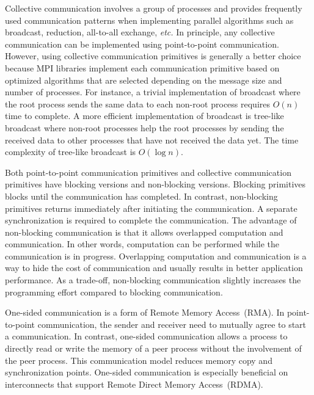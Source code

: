 Collective communication involves a group of processes and provides frequently
used communication patterns when implementing parallel algorithms such as
broadcast, reduction, all-to-all exchange, \emph{etc.} In principle, any
collective communication can be implemented using point-to-point
communication. However, using collective communication primitives is generally
a better choice because MPI libraries implement each communication primitive
based on optimized algorithms that are selected depending on the message size
and number of processes. For instance, a trivial implementation of broadcast
where the root process sends the same data to each non-root process requires
$O(n)$ time to complete. A more efficient implementation of broadcast is
tree-like broadcast where non-root processes help the root processes by
sending the received data to other processes that have not received the data
yet. The time complexity of tree-like broadcast is $O(\log n)$.

Both point-to-point communication primitives and collective communication
primitives have blocking versions and non-blocking versions. Blocking
primitives blocks until the communication has completed. In contrast,
non-blocking primitives returns immediately after initiating the
communication. A separate synchronization is required to complete the
communication. The advantage of non-blocking communication is that it allows
overlapped computation and communication. In other words, computation can be
performed while the communication is in progress. Overlapping computation and
communication is a way to hide the cost of communication and usually results
in better application performance. As a trade-off, non-blocking communication
slightly increases the programming effort compared to blocking communication.

One-sided communication is a form of Remote Memory Access~(RMA). In
point-to-point communication, the sender and receiver need to mutually agree
to start a communication. In contrast, one-sided communication allows
a process to directly read or write the memory of a peer process without the
involvement of the peer process. This communication model reduces memory copy
and synchronization points. One-sided communication is especially beneficial
on interconnects that support Remote Direct Memory Access~(RDMA).

